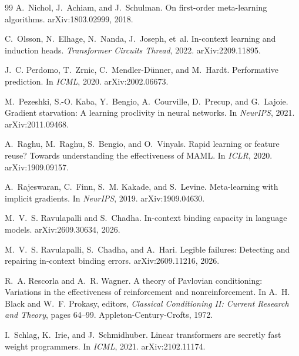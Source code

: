 \documentclass[11pt]{article}
\begin{document}
\begin{thebibliography}{99}
A.~Nichol, J.~Achiam, and J.~Schulman.
\newblock On first-order meta-learning algorithms.
\newblock arXiv:1803.02999, 2018.

C.~Olsson, N.~Elhage, N.~Nanda, J.~Joseph, et~al.
\newblock In-context learning and induction heads.
\newblock \emph{Transformer Circuits Thread}, 2022. arXiv:2209.11895.

J.~C. Perdomo, T.~Zrnic, C.~Mendler-D{\"u}nner, and M.~Hardt.
\newblock Performative prediction.
\newblock In \emph{ICML}, 2020. arXiv:2002.06673.

M.~Pezeshki, S.-O. Kaba, Y.~Bengio, A.~Courville, D.~Precup, and G.~Lajoie.
\newblock Gradient starvation: A learning proclivity in neural networks.
\newblock In \emph{NeurIPS}, 2021. arXiv:2011.09468.

A.~Raghu, M.~Raghu, S.~Bengio, and O.~Vinyals.
\newblock Rapid learning or feature reuse? {T}owards understanding the effectiveness of {MAML}.
\newblock In \emph{ICLR}, 2020. arXiv:1909.09157.

A.~Rajeswaran, C.~Finn, S.~M. Kakade, and S.~Levine.
\newblock Meta-learning with implicit gradients.
\newblock In \emph{NeurIPS}, 2019. arXiv:1909.04630.

M.~V.~S. Ravulapalli and S.~Chadha.
\newblock In-context binding capacity in language models.
\newblock arXiv:2609.30634, 2026.

M.~V.~S. Ravulapalli, S.~Chadha, and A.~Hari.
\newblock Legible failures: Detecting and repairing in-context binding errors.
\newblock arXiv:2609.11216, 2026.

R.~A. Rescorla and A.~R. Wagner.
\newblock A theory of {P}avlovian conditioning: Variations in the effectiveness of reinforcement
  and nonreinforcement.
\newblock In A.~H. Black and W.~F. Prokasy, editors, \emph{Classical Conditioning II: Current
  Research and Theory}, pages 64--99. Appleton-Century-Crofts, 1972.

I.~Schlag, K.~Irie, and J.~Schmidhuber.
\newblock Linear transformers are secretly fast weight programmers.
\newblock In \emph{ICML}, 2021. arXiv:2102.11174.


\end{thebibliography}
\end{document}
